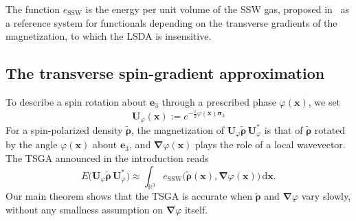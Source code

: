 \documentclass[final,reqno]{amsart}
\theoremstyle{remark}
\newcommand{\wt}[1]{\widetilde{#1}}
\newcommand{\RR}{\mathbb{R}}
\newcommand{\SSW}{\mathrm{SSW}}
\newcommand{\grad}{\bm{\nabla}}
\newcommand{\dd}{\mathrm{d}}
\begin{document}
The function $e_\SSW$ is the energy per unit volume of the SSW gas, proposed in~\cite{eich2013transverse} as a reference system for functionals depending on the transverse gradients of the magnetization, to which the LSDA is insensitive.

\subsection{The transverse spin-gradient approximation}\label{sec:tsga}

To describe a spin rotation about $\mathbf{e}_3$ through a prescribed phase $\varphi(\mathbf{x})$, we set
\begin{equation}\label{eq:def_U_phi}
\boxed{\mathbf{U}_\varphi(\mathbf{x}):=e^{-\frac i2\varphi(\mathbf{x})\bm{\sigma}_3}}
\end{equation}
 For a spin-polarized density $\wt{\bm{\rho}}$, the magnetization of $\mathbf{U}_\varphi\wt{\bm{\rho}}\,\mathbf{U}_\varphi^*$ is that of $\wt{\bm{\rho}}$ rotated by the angle $\varphi(\mathbf{x})$ about $\mathbf{e}_3$, and $\grad\varphi(\mathbf{x})$ plays the role of a local wavevector. The TSGA announced in the introduction reads
\begin{equation}\label{eq:LSSWA}
E\big(\mathbf{U}_\varphi\wt{\bm{\rho}}\,\mathbf{U}_\varphi^*\big)\approx\int_{\RR^3}e_\SSW\big(\wt{\bm{\rho}}(\mathbf{x}),\grad\varphi(\mathbf{x})\big)\,\dd\mathbf{x}.
\end{equation}
Our main theorem shows that the TSGA is accurate when $\wt{\bm{\rho}}$ and $\grad\varphi$ vary slowly, without any smallness assumption on $\grad\varphi$ itself. 
\end{document}
